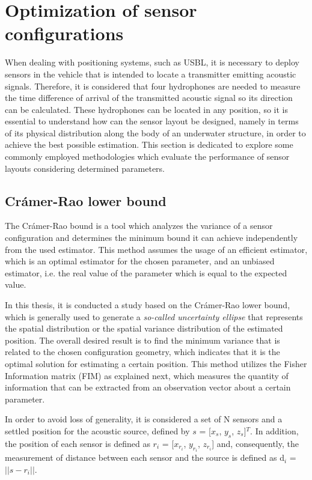 \section{Optimization of sensor configurations}

When dealing with positioning systems, such as USBL, it is necessary to deploy sensors in the vehicle that is intended to locate a transmitter emitting acoustic signals. Therefore, it is considered that four hydrophones are needed to measure the time difference of arrival of the transmitted acoustic signal so its direction can be calculated. These hydrophones can be located in any position, so it is essential to understand how can the sensor layout be designed, namely in terms of its physical distribution along the body of an underwater structure, in order to achieve the best possible estimation. This section is dedicated to explore some commonly employed methodologies which evaluate the performance of sensor layouts considering determined parameters.

\subsection{Crámer-Rao lower bound}	\label{sec:cramer}

The Crámer-Rao bound is a tool which analyzes the variance of a sensor configuration and determines the minimum bound it can achieve independently from the used estimator. This method assumes the usage of an efficient estimator, which is an optimal estimator for the chosen parameter, and an unbiased estimator, i.e. the real value of the parameter which is equal to the expected value.

In this thesis, it is conducted a study based on the Crámer-Rao lower bound, which is generally used to generate a \textit{so-called uncertainty ellipse} \cite{bishop-cramer-rao} that represents the spatial distribution or the spatial variance distribution of the estimated position. The overall desired result is to find the minimum variance that is related to the chosen configuration geometry, which indicates that it is the optimal solution for estimating a certain position. This method utilizes the Fisher Information matrix (FIM) as explained next, which measures the quantity of information that can be extracted from an observation vector about a certain parameter.

In order to avoid loss of generality, it is considered a set of N sensors and a settled position for the acoustic source, defined by $s$ = [$x_{s}$, $y_{s}$, $z_{s}$]$^T$. In addition, the position of each sensor is defined as $r_{i}$ = [$x_{r_{i}}$, $y_{r_{i}}$, $z_{r_{i}}$] and, consequently, the measurement of distance between each sensor and the source is defined as d$_{i}$ = $|| s - r_{i} ||$.

